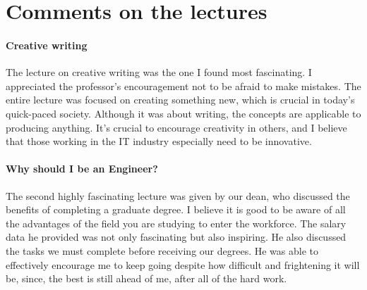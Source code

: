 \documentclass[10pt,twoside,english,a4paper]{article}
\begin{document}



\newpage
\section*{Comments on the lectures} \label{comments}
\paragraph{Creative writing}The lecture on creative writing was the one I found most fascinating. I appreciated the professor's encouragement not to be afraid to make mistakes. The entire lecture was focused on creating something new, which is crucial in today's quick-paced society. Although it was about writing, the concepts are applicable to producing anything. It's crucial to encourage creativity in others, and I believe that those working in the IT industry especially need to be innovative.
\paragraph{Why should I be an Engineer?}The second highly fascinating lecture was given by our dean, who discussed the benefits of completing a graduate degree. I believe it is good to be aware of all the advantages of the field you are studying to enter the workforce. The salary data he provided was not only fascinating but also inspiring. He also discussed the tasks we must complete before receiving our degrees. He was able to effectively encourage me to keep going despite how difficult and frightening it will be, since, the best is still ahead of me, after all of the hard work.
\end{document}
